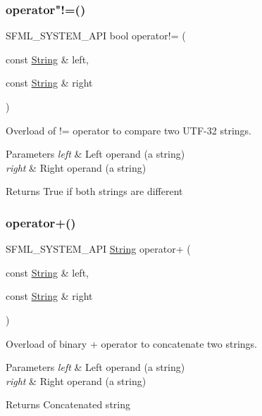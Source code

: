 \subsubsection{\texorpdfstring{operator"!=()}{operator!=()}}
{\footnotesize\ttfamily S\+F\+M\+L\+\_\+\+S\+Y\+S\+T\+E\+M\+\_\+\+A\+PI bool operator!= (\begin{DoxyParamCaption}\item[{const \hyperlink{classsf_1_1_string}{String} \&}]{left,  }\item[{const \hyperlink{classsf_1_1_string}{String} \&}]{right }\end{DoxyParamCaption})\hspace{0.3cm}{\ttfamily [related]}}



Overload of != operator to compare two U\+T\+F-\/32 strings. 


\begin{DoxyParams}{Parameters}
{\em left} & Left operand (a string) \\
\hline
{\em right} & Right operand (a string)\\
\hline
\end{DoxyParams}
\begin{DoxyReturn}{Returns}
True if both strings are different 
\end{DoxyReturn}
\mbox{\label{classsf_1_1_string_a55ef2bf7dc6b295ef7127b0bc1e58760}} 
\subsubsection{\texorpdfstring{operator+()}{operator+()}}
{\footnotesize\ttfamily S\+F\+M\+L\+\_\+\+S\+Y\+S\+T\+E\+M\+\_\+\+A\+PI \hyperlink{classsf_1_1_string}{String} operator+ (\begin{DoxyParamCaption}\item[{const \hyperlink{classsf_1_1_string}{String} \&}]{left,  }\item[{const \hyperlink{classsf_1_1_string}{String} \&}]{right }\end{DoxyParamCaption})\hspace{0.3cm}{\ttfamily [related]}}



Overload of binary + operator to concatenate two strings. 


\begin{DoxyParams}{Parameters}
{\em left} & Left operand (a string) \\
\hline
{\em right} & Right operand (a string)\\
\hline
\end{DoxyParams}
\begin{DoxyReturn}{Returns}
Concatenated string 
\end{DoxyReturn}
\mbox{\label{classsf_1_1_string_ac2ca5a7703402a2bbafd85eec6d1e846}} 
